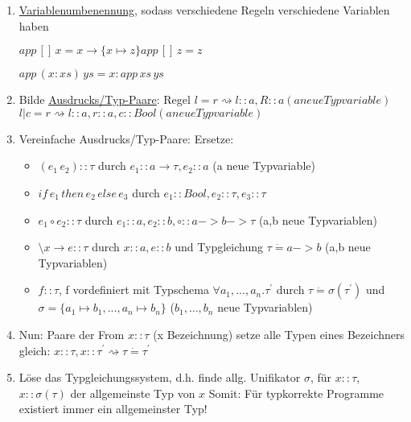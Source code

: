 \documentclass[12pt]{article}
\begin{document}
\begin{enumerate}

\item \underline{Variablenumbenennung}, sodass verschiedene Regeln verschiedene Variablen haben

		$app\, []\, x = x				\rightarrow \{x 	\mapsto z\}		app\, []\, z = z$ \linebreak
		
		$app\, (x:xs)\, ys = x: app\, xs\, ys$
		
\item Bilde \underline{Ausdrucks/Typ-Paare}: Regel $l = r \rightsquigarrow l::a, R::a (a neue Typvariable)$
												$l|c = r \rightsquigarrow l::a,r::a, c::Bool (a neue Typvariable)$
												
\item Vereinfache Ausdrucks/Typ-Paare:
	Ersetze:
	\begin{itemize}
		\item $(e_1\, e_2)::\tau $ durch $e_1::a \rightarrow \tau, e_2::a $ (a neue Typvariable)

		\item $if \, e_1\, then\, e_2 \, else\, e_3$ durch $e_1::Bool, e_2::\tau, e_3::\tau$
		
		\item $e_1 \circ e_2 ::\tau$ durch $e_1::a , e_2 ::b , \circ::a->b->\tau$ (a,b neue Typvariablen)
		
		\item $\setminus x \rightarrow e ::\tau$ durch $x::a, e::b$ und Typgleichung $\tau \dot{=} a->b$ (a,b neue Typvariablen)
		
		\item $f::\tau$, f vordefiniert mit Typschema $\forall a_1,...,a_n.\tau^\prime$ durch $\tau \dot{=} \sigma(\tau^\prime)$ und $\sigma=\{a_1\mapsto b_1, ..., a_n \mapsto b_n\}$ ($b_1,...,b_n$ neue Typvariablen)	
	\end{itemize}
	
\item Nun: Paare der From $x::\tau$ (x Bezeichnung) setze alle Typen eines Bezeichners gleich: $x::\tau, x::\tau^\prime \rightsquigarrow \tau \dot{=} \tau^\prime$

\item Löse das Typgleichungssystem, d.h. finde allg. Unifikator $\sigma$, für $x::\tau$, $x::\sigma(\tau)$ der allgemeinste Typ von $x$
	Somit: Für typkorrekte Programme existiert immer ein allgemeinster Typ!
	
\end{enumerate}
\end{document}

